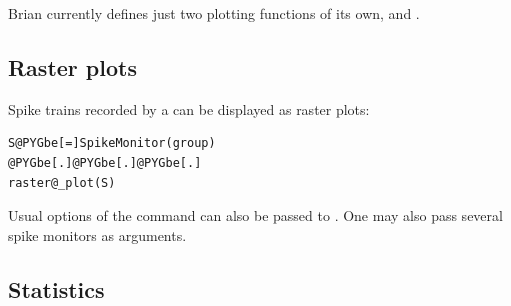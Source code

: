 \documentclass[letterpaper,10pt,english]{manual}
\begin{document}
Brian currently defines just two plotting functions of its own,
\hyperlink{brian.raster_plot}{} and \hyperlink{brian.hist_plot}{}.


\subsection{Raster plots}

Spike trains recorded by a \hyperlink{brian.SpikeMonitor}{} can be displayed as raster plots:

\begin{Verbatim}[commandchars=@\[\]]
S@PYGbe[=]SpikeMonitor(group)
@PYGbe[.]@PYGbe[.]@PYGbe[.]
raster@_plot(S)
\end{Verbatim}

Usual options of the  command can also be passed to \hyperlink{brian.raster_plot}{}. One may also pass
several spike monitors as arguments.


\subsection{Statistics}
\end{document}

